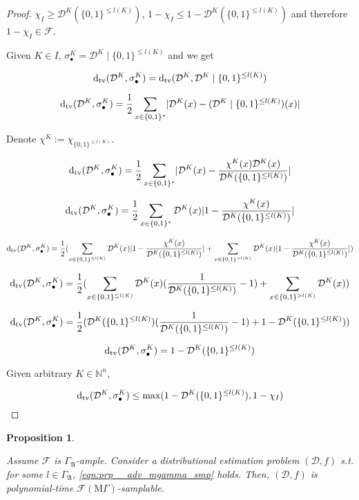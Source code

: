 \documentclass{article}
\numberwithin{equation}{section}
\theoremstyle{definition}
\theoremstyle{plain}
\newtheorem{proposition}{Proposition}[section]
\newcommand{\Bool}{\{0,1\}}
\newcommand{\Words}{{\Bool^*}}
\newcommand{\WordsLen}[1]{{\Bool^{#1}}}
\newcommand{\Dtv}{\operatorname{d}_{\textnormal{tv}}}
\newcommand{\Nats}{\mathbb{N}}
\newcommand{\Abs}[1]{\lvert #1 \rvert}
\newcommand{\Dist}{\mathcal{D}}
\newcommand{\GrowA}{\Gamma_{\mathfrak{A}}}
\newcommand{\MGrow}{\mathrm{M}\Gamma}
\newcommand{\Fall}{\mathcal{F}}
\newcommand{\EMG}{\Fall(\MGrow)}
\begin{document}
\begin{proof}

$\chi_I \geq \Dist^{K}(\Bool^{\leq l(K)})$, $1 - \chi_{I} \leq 1 - \Dist^{K}(\Bool^{\leq l(K)})$ and therefore $1 - \chi_I \in \Fall$.

Given $K \in I$, ${\sigma_\bullet^K = \Dist^{K} \mid \Bool^{\leq l(K)}}$ and we get

$$\Dtv(\Dist^{K}, \sigma_\bullet^K) = \Dtv(\Dist^{K}, \Dist^{K} \mid \Bool^{\leq l(K)})$$

$$\Dtv(\Dist^{K}, \sigma_\bullet^K) = \frac{1}{2} \sum_{x \in \Words} \Abs{\Dist^{K}(x)-(\Dist^{K} \mid \WordsLen{\leq l(K)})(x)}$$

Denote $\chi^K:=\chi_{\WordsLen{\leq l(K)}}$.

$$\Dtv(\Dist^{K}, \sigma_\bullet^K) = \frac{1}{2} \sum_{x \in \Words} \Abs{\Dist^{K}(x)-\frac{\chi^K(x)\Dist^{K}(x)}{\Dist^{K}(\WordsLen{\leq l(K)})}}$$

$$\Dtv(\Dist^{K}, \sigma_\bullet^K) = \frac{1}{2} \sum_{x \in \Words} \Dist^{K}(x) \Abs{1-\frac{\chi^K(x)}{\Dist^{K}(\Bool^{\leq l(K)})}}$$

$$\Dtv(\Dist^{K}, \sigma_\bullet^K) = \frac{1}{2} (\sum_{x \in \Bool^{\leq l(K)}} \Dist^{K}(x) \Abs{1-\frac{\chi^K(x)}{\Dist^{K}(\Bool^{\leq l(K)})}}+\sum_{x \in \Bool^{>l(K)}} \Dist^{K}(x) \Abs{1-\frac{\chi^K(x)}{\Dist^{K}(\Bool^{\leq l(K)})}})$$

$$\Dtv(\Dist^{K}, \sigma_\bullet^K) = \frac{1}{2} (\sum_{x \in \Bool^{\leq l(K)}} \Dist^{K}(x)(\frac{1}{\Dist^{K}(\Bool^{\leq l(K)})}-1)+\sum_{x \in \Bool^{>l(K)}} \Dist^{K}(x))$$

$$\Dtv(\Dist^{K}, \sigma_\bullet^K) = \frac{1}{2} (\Dist^{K}(\Bool^{\leq l(K)})(\frac{1}{\Dist^{K}(\Bool^{\leq l(K)})}-1)+1 - \Dist^{K}(\Bool^{\leq l(K)}))$$

$$\Dtv(\Dist^{K}, \sigma_\bullet^K) = 1-\Dist^{K}(\Bool^{\leq l(K)})$$

Given arbitrary $K \in \Nats^n$,

$$\Dtv(\Dist^{K}, \sigma_\bullet^K) \leq \max(1-\Dist^{K}(\Bool^{\leq l(K)}), 1-\chi_I)$$
\end{proof}

\begin{samepage}
\begin{proposition}
\label{prp:adv_mgamma_gen}

Assume $\Fall$ is $\GrowA$-ample. Consider a distributional estimation problem $(\Dist,f)$ s.t. for some $l \in \GrowA$, \ref{eqn:prp__adv_mgamma_smp} holds. Then, $(\Dist,f)$ is polynomial-time $\EMG$-samplable. 

\end{proposition}
\end{samepage}
\end{document}
